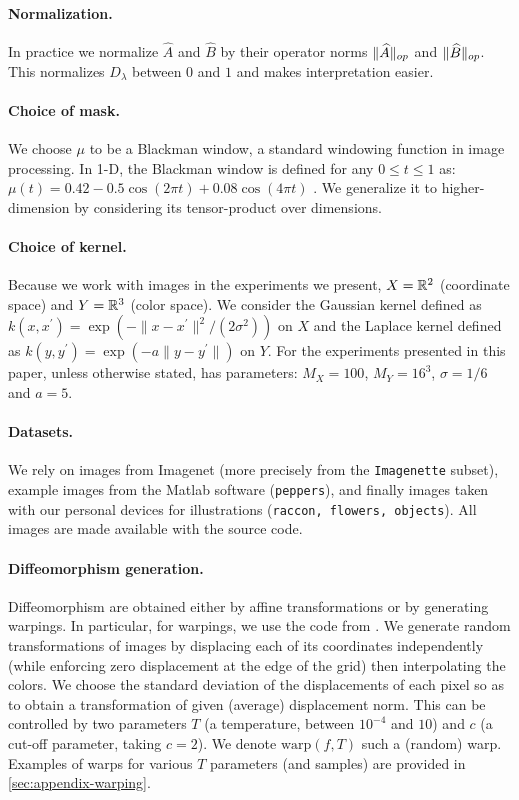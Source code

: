 \paragraph{Normalization.}
In practice we normalize $\widehat A$ and $\widehat B$ by their operator norms $\lVert{\widehat A}\rVert_{op}$ and $\lVert{\widehat B}\rVert_{op}$. This normalizes $D_\lambda$ between $0$ and $1$ and makes interpretation easier.

\paragraph{Choice of mask.}
We choose $\mu$ to be a Blackman window, a standard windowing function in image processing. In 1-D, the Blackman window is defined for any $0 \leq t \leq 1$ as:
$\mu(t) = 0.42 - 0.5\cos(2\pi t) + 0.08 \cos(4\pi t)$ \cite{oppenheim99}.
We generalize it to higher-dimension by considering its tensor-product over dimensions.

\paragraph{Choice of kernel.}
Because we work with images in the experiments we present, $X = \mathbb R^2$ (coordinate space) and $Y = \mathbb R^3$ (color space). We consider the Gaussian kernel defined as $k(x, x^\prime) = \exp(- \|x - x^\prime\|^2/(2\sigma^2))$ on $X$ and the Laplace kernel defined as $k(y, y^\prime) = \exp(-a \| y - y^\prime \|)$ on $Y$. For the experiments presented in this paper, unless otherwise stated, \Diffy has parameters: $M_X = 100$, $M_Y = 16^3$, $\sigma = 1/6$ and $a=5$.

\paragraph{Datasets.}
We rely on images from Imagenet (more precisely from the \texttt{Imagenette} subset), example images from the Matlab software (\texttt{peppers}), and finally images taken with our personal devices for illustrations (\texttt{raccon, flowers, objects}). All images are made available with the source code.

\paragraph{Diffeomorphism generation.} Diffeomorphism are obtained either by affine transformations or by generating warpings. In particular, for warpings, we use the code from \cite{wyartdiffeo}. We generate random transformations of images by displacing each of its coordinates independently (while enforcing zero displacement at the edge of the grid) then interpolating the colors.  We choose the standard deviation of the displacements of each pixel so as to obtain a transformation of given (average) displacement norm. This can be controlled by two parameters $T$ (a temperature, between $10^{-4}$ and $10$) and $c$ (a cut-off parameter, taking $c=2$). We denote $\text{warp}(f, T)$ such a (random) warp. Examples of warps for various $T$ parameters (and samples) are provided in \cref{sec:appendix-warping}.

